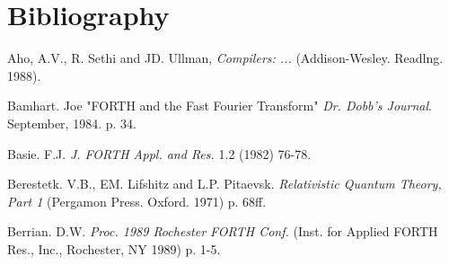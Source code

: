 \chapter{Bibliography}

Aho, A.V., R. Sethi and JD. Ullman, \textit{Compilers: ...} (Addison-Wesley. Readlng. 1988).

Bamhart. Joe "FORTH and the Fast Fourier Transform" \textit{Dr. Dobb's Journal}. September, 1984. p. 34.

Basie. F.J. \textit{J. FORTH Appl. and Res.} 1.2 (1982) 76-78.

Berestetk. V.B., EM. Lifshitz and L.P. Pitaevsk. \textit{Relativistic Quantum Theory, Part 1} (Pergamon Press. Oxford. 1971) p. 68ff.

Berrian. D.W. \textit{Proc. 1989 Rochester FORTH Conf.} (Inst. for Applied FORTH Res., Inc., Rochester, NY 1989) p. 1-5.

